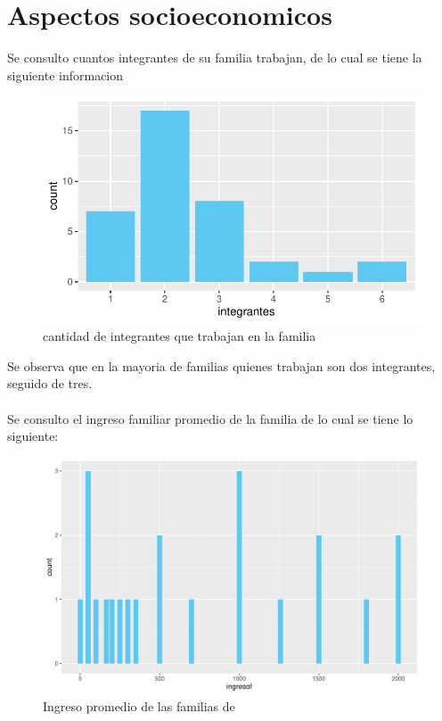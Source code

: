 \documentclass[12pt]{article}\usepackage[]{graphicx}\usepackage[]{xcolor}
\makeatletter
\def\maxwidth{ %
  \ifdim\Gin@nat@width>\linewidth
    \linewidth
  \else
    \Gin@nat@width
  \fi
}
\newenvironment{kframe}{%
 \def\at@end@of@kframe{}%
 \ifinner\ifhmode%
  \def\at@end@of@kframe{\end{minipage}}%
  \begin{minipage}{\columnwidth}%
 \fi\fi%
 \def\FrameCommand##1{\hskip\@totalleftmargin \hskip-\fboxsep
 \colorbox{shadecolor}{##1}\hskip-\fboxsep
     \hskip-\linewidth \hskip-\@totalleftmargin \hskip\columnwidth}%
 \MakeFramed {\advance\hsize-\width
   \@totalleftmargin\z@ \linewidth\hsize
   \@setminipage}}%
 {\par\unskip\endMakeFramed%
 \at@end@of@kframe}
\newenvironment{knitrout}{}{} %
\makeatother
\begin{document}
	\section{Aspectos socioeconomicos}
	Se consulto cuantos integrantes de su familia trabajan, de lo cual se tiene la siguiente informacion
	\begin{figure}[H]
	\centering
\begin{knitrout}
\color{fgcolor}
\includegraphics[width=\maxwidth]{figure/diecinueve-1} 
\end{knitrout}
	\caption{cantidad de integrantes que trabajan en la familia}
	\end{figure}
	Se observa que en la mayoria de familias quienes trabajan son dos integrantes, seguido de tres.\\
	\\
  Se consulto el ingreso familiar promedio de la familia de lo cual se tiene lo siguiente:
	\begin{figure}[H]
	\centering
\begin{knitrout}
\color{fgcolor}\begin{kframe}


{\ttfamily\noindent\color{warningcolor}{\#\# Warning: NAs introducidos por coerción}}\end{kframe}
\includegraphics[width=\maxwidth]{figure/veinte-1} 
\end{knitrout}
	\caption{Ingreso promedio de las familias de \comunidad}
	\end{figure}
\end{document}
